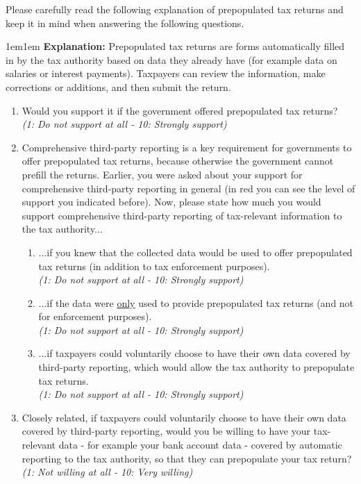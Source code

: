 \documentclass[11pt]{article}
\begin{document}
\vspace{0.5em}
\noindent Please carefully read the following explanation of prepopulated tax returns and keep it in mind when answering the following questions. \\
\begin{adjustwidth}{1em}{1em} \textbf{Explanation:} Prepopulated tax returns are forms automatically filled in by the tax authority  based on data they already have (for example data on salaries or interest payments). Taxpayers can review the information, make corrections or additions, and then submit the return.
\end{adjustwidth}
\begin{enumerate}[resume]
    \item Would you support it if the government offered prepopulated tax returns?\\
    \textit{(1: Do not support at all - 10: Strongly support)}
    \item Comprehensive third-party reporting is a key requirement for governments to offer prepopulated tax returns, because otherwise the government cannot prefill the returns. Earlier, you were asked about your support for comprehensive third-party reporting in general (in red you can see the level of support you indicated before). Now, please state how much you would support comprehensive third-party reporting of tax-relevant information to the tax authority... 
    \begin{enumerate}
    \item ...if you knew that the collected data would be used to offer prepopulated tax returns (in addition to tax enforcement purposes).\\ \textit{(1: Do not support at all - 10: Strongly support)}    
    \item ...if the data were \underline{only} used to provide prepopulated tax returns (and not for enforcement purposes).\\ \textit{(1: Do not support at all - 10: Strongly support)}
    \item ...if taxpayers could voluntarily choose to have their own data covered by third-party reporting, which would allow the tax authority to prepopulate tax returns. \\
    \textit{(1: Do not support at all - 10: Strongly support)}
    \end{enumerate}
    \item Closely related, if taxpayers could voluntarily choose to have their own data covered by third-party reporting, would you be willing to have your tax-relevant data - for example your bank account data - covered by automatic reporting to the tax authority, so that they can prepopulate your tax return?   \\
    \textit{(1: Not willing at all - 10: Very willing)}
\end{enumerate}
\end{document}
